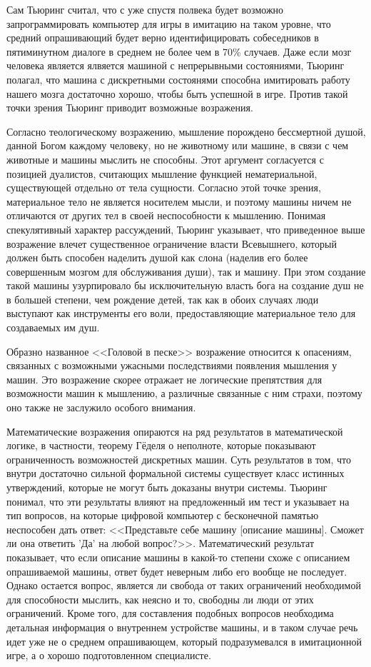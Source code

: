 \documentclass[12pt, specialist, subf, substylefile = spbu.rtx]{disser}
\begin{document}
Сам Тьюринг считал, что с уже спустя полвека будет возможно запрограммировать компьютер для игры в имитацию на таком уровне, что средний опрашивающий будет верно идентифицировать собеседников в пятиминутном диалоге в среднем не более чем в 70\% случаев. Даже если мозг человека является ялвяется машиной с непрерывными состояниями, Тьюринг полагал, что машина с дискретными состоянями способна имитировать работу нашего мозга достаточно хорошо, чтобы быть успешной в игре. Против такой точки зрения Тьюринг приводит возможные возражения.

Согласно теологическому возражению, мышление порождено бессмертной душой, данной Богом каждому человеку, но не животному или машине, в связи с чем животные и машины мыслить не способны. Этот аргумент согласуется с позицией дуалистов, считающих мышление функцией нематериальной, существующей отдельно от тела сущности. Согласно этой точке зрения, материальное тело не является носителем мысли, и поэтому машины ничем не отличаются от других тел в своей неспособности к мышлению. Понимая спекулятивный характер рассуждений, Тьюринг указывает, что приведенное выше возражение влечет существенное ограничение власти Всевышнего, который должен быть способен наделить душой как слона (наделив его более совершенным мозгом для обслуживания души), так и машину. При этом создание такой машины узурпировало бы исключительную власть бога на создание душ не в большей степени, чем рождение детей, так как в обоих случаях люди выступают как инструменты его воли, предоставляющие материальное тело для создаваемых им душ.

Образно названное <<Головой в песке>> возражение относится к опасениям, связанных с возможными ужасными последствиями появления мышления у машин. Это возражение скорее отражает не логические препятствия для возможности машин к мышлению, а различные связанные с ним страхи, поэтому оно также не заслужило особого внимания.

Математические возражения опираются на ряд результатов в математической логике, в частности, теорему Гёделя о неполноте, которые показывают ограниченность возможностей дискретных машин. Суть результатов в том, что внутри достаточно сильной формальной системы существует класс истинных утверждений, которые не могут быть доказаны внутри системы. Тьюринг понимал, что эти результаты влияют на предложенный им тест и указывает на тип вопросов, на которые цифровой компьютер с бесконечной памятью неспособен дать ответ: <<Представьте себе машину [описание машины]. Сможет ли она ответить 'Да' на любой вопрос?>>. Математический результат показывает, что если описание машины в какой-то степени схоже с описанием опрашиваемой машины, ответ будет неверным либо его вообще не последует. Однако остается вопрос, является ли свобода от таких ограничений необходимой для способности мыслить, как неясно и то, свободны ли люди от этих ограничений. Кроме того, для составления подобных вопросов необходима детальная информация о внутреннем устройстве машины, и в таком случае речь идет уже не о среднем опрашивающем, который подразумевался в имитационной игре, а о хорошо подготовленном специалисте.
\end{document}
